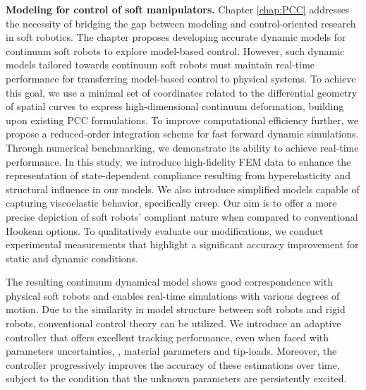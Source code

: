 \textbf{Modeling for control of soft manipulators.} Chapter \ref{chap:PCC} addresses the necessity of bridging the gap between modeling and control-oriented research in soft robotics. The chapter proposes developing accurate dynamic models for continuum soft robots to explore model-based control. However, such dynamic models tailored towards continuum soft robots must maintain real-time performance for transferring model-based control to physical systems. To achieve this goal, we use a minimal set of coordinates related to the differential geometry of spatial curves to express high-dimensional continuum deformation, building upon existing PCC formulations. To improve computational efficiency further, we propose a reduced-order integration scheme for fast forward dynamic simulations. Through numerical benchmarking, we demonstrate its ability to achieve real-time performance. In this study, we introduce high-fidelity FEM data to enhance the representation of state-dependent compliance resulting from hyperelasticity and structural influence in our models. We also introduce simplified models capable of capturing viscoelastic behavior, specifically creep. Our aim is to offer a more precise depiction of soft robots' compliant nature when compared to conventional Hookean options. To qualitatively evaluate our modifications, we conduct experimental measurements that highlight a significant accuracy improvement for static and dynamic conditions.

The resulting continuum dynamical model shows good correspondence with physical soft robots and enables real-time simulations with various degrees of motion. Due to the similarity in model structure between soft robots and rigid robots, conventional control theory can be utilized. We introduce an adaptive controller that offers excellent tracking performance, even when faced with parameters uncertainties, \eg, material parameters and tip-loads. Moreover, the controller progressively improves the accuracy of these estimations over time, subject to the condition that the unknown parameters are persistently excited.

